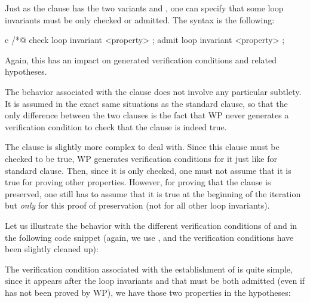 

\label{l3:statements-loops-inv-kinds}


Just as the  clause has the two variants
 and , one can specify that some
loop invariants must be only checked or admitted. The syntax is the following:


\begin{CodeBlock}{c}
/*@ check loop invariant <property> ;
    admit loop invariant <property> ;
\end{CodeBlock}


Again, this has an impact on generated verification conditions and related
hypotheses.


The behavior associated with the  clause does not
involve any particular subtlety. It is assumed in the exact same situations as
the standard  clause, so that the only difference
between the two clauses is the fact that WP never generates a verification
condition to check that the  clause is indeed
true.


The  clause is slightly more complex to deal
with. Since this clause must be checked to be true, WP generates verification
conditions for it just like for standard  clause.
Then, since it is only checked, one must not assume that it is true for proving
other properties. However, for proving that the 
clause is preserved, one still has to assume that it is true at the beginning of
the iteration but \textit{only} for this proof of preservation (not for all other
loop invariants).


Let us illustrate the behavior with the different verification conditions of
 and  in the following code snippet (again, we
use , and the verification conditions have been slightly
cleaned up):




The verification condition associated with the establishment of  is
quite simple, since it appears after the loop invariants  and
 that must be both admitted (even if  has not been
proved by WP), we have those two properties in the hypotheses:




